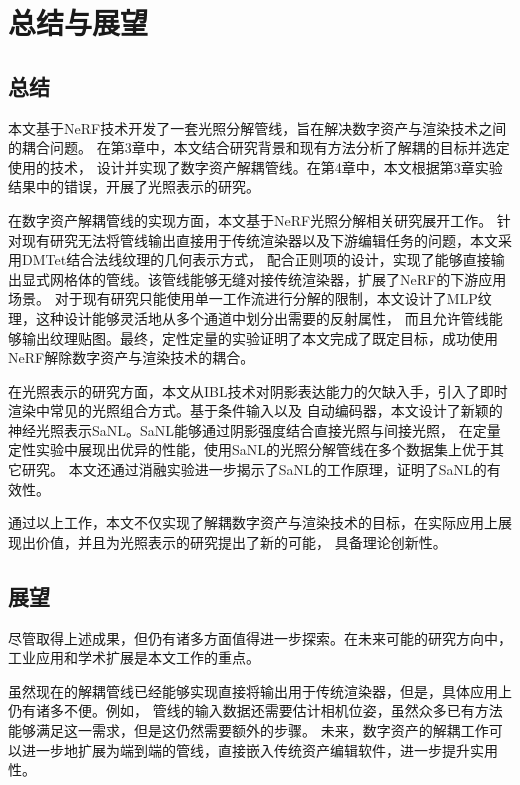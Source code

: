 
\chapter{总结与展望}

\section{总结}

本文基于NeRF技术开发了一套光照分解管线，旨在解决数字资产与渲染技术之间的耦合问题。
在第3章中，本文结合研究背景和现有方法分析了解耦的目标并选定使用的技术，
设计并实现了数字资产解耦管线。在第4章中，本文根据第3章实验结果中的错误，开展了光照表示的研究。

在数字资产解耦管线的实现方面，本文基于NeRF光照分解相关研究展开工作。
针对现有研究无法将管线输出直接用于传统渲染器以及下游编辑任务的问题，本文采用DMTet结合法线纹理的几何表示方式，
配合正则项的设计，实现了能够直接输出显式网格体的管线。该管线能够无缝对接传统渲染器，扩展了NeRF的下游应用场景。
对于现有研究只能使用单一工作流进行分解的限制，本文设计了MLP纹理，这种设计能够灵活地从多个通道中划分出需要的反射属性，
而且允许管线能够输出纹理贴图。最终，定性定量的实验证明了本文完成了既定目标，成功使用NeRF解除数字资产与渲染技术的耦合。

在光照表示的研究方面，本文从IBL技术对阴影表达能力的欠缺入手，引入了即时渲染中常见的光照组合方式。基于条件输入以及
自动编码器，本文设计了新颖的神经光照表示SaNL。SaNL能够通过阴影强度结合直接光照与间接光照，
在定量定性实验中展现出优异的性能，使用SaNL的光照分解管线在多个数据集上优于其它研究。
本文还通过消融实验进一步揭示了SaNL的工作原理，证明了SaNL的有效性。

通过以上工作，本文不仅实现了解耦数字资产与渲染技术的目标，在实际应用上展现出价值，并且为光照表示的研究提出了新的可能，
具备理论创新性。

\section{展望}

尽管取得上述成果，但仍有诸多方面值得进一步探索。在未来可能的研究方向中，工业应用和学术扩展是本文工作的重点。

虽然现在的解耦管线已经能够实现直接将输出用于传统渲染器，但是，具体应用上仍有诸多不便。例如，
管线的输入数据还需要估计相机位姿，虽然众多已有方法能够满足这一需求，但是这仍然需要额外的步骤。
未来，数字资产的解耦工作可以进一步地扩展为端到端的管线，直接嵌入传统资产编辑软件，进一步提升实用性。

